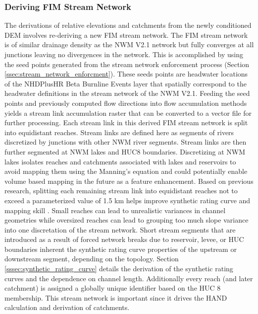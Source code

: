 \subsubsection{Deriving FIM Stream Network}
\label{sssec:deriving_fim_stream_network}
%
The derivations of relative elevations and catchments from the newly conditioned DEM involves re-deriving a new FIM stream network. 
The FIM stream network is of similar drainage density as the NWM V2.1 network but fully converges at all junctions leaving no divergences in the network.
This is accomplished by using the seed points generated from the stream network enforcement process (Section \ref{ssec:stream_network_enforcment}).
These seeds points are headwater locations of the NHDPlusHR Beta Burnline Events layer that spatially correspond to the headwater definitions in the stream network of the NWM V2.1.
Feeding the seed points and previously computed flow directions into flow accumulation methods \cite{wallis2009parallel,tarboton1997new,tarboton2005terrain} yields a stream link accumulation raster that can be converted to a vector file for further processing.
Each stream link in this derived FIM stream network is split into equidistant reaches.
Stream links are defined here as segments of rivers discretized by junctions with other NWM river segments.
Stream links are then further segmented at NWM lakes and HUC8 boundaries.
Discretizing at NWM lakes isolates reaches and catchments associated with lakes and reservoirs to avoid mapping them using the Manning's equation and could potentially enable volume based mapping in the future as a feature enhancement.
Based on previous research, splitting each remaining stream link into equidistant reaches not to exceed a parameterized value of 1.5 km helps improve synthetic rating curve and mapping skill \cite{garousi2019terrain,godbout2019error,zheng2018geoflood}.
Small reaches can lead to unrealistic variances in channel geometries while oversized reaches can lead to grouping too much slope variance into one discretation of the stream network.
Short stream segments that are introduced as a result of forced network breaks due to reservoir, levee, or HUC boundaries inherent the synthetic rating curve properties of the upstream or downstream segment, depending on the topology.
Section \ref{sssec:synthetic_rating_curve} details the derivation of the synthetic rating curves and the dependence on channel length. 
Additionally every reach (and later catchment) is assigned a globally unique identifier based on the HUC 8 membership.
This stream network is important since it drives the HAND calculation and derivation of catchments.
%
